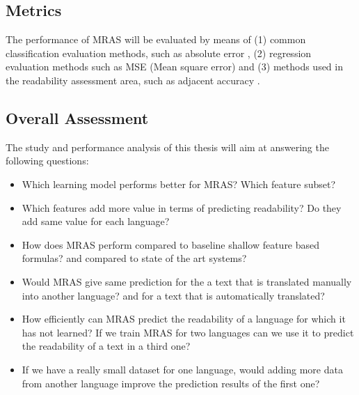 \documentclass[12pt]{article}
\begin{document}

\subsection{Metrics}
The performance of MRAS will be evaluated by means of (1) common classification evaluation methods, such as absolute error \cite{croft2010search}, (2) regression evaluation methods such as MSE (Mean square error) \cite{croft2010search} and (3) methods used in the readability assessment area, such as adjacent accuracy \cite{franccois2012ai}. 

\subsection{Overall Assessment}
The study and performance analysis of this thesis will aim at answering the following questions:
\begin{itemize}

\item Which learning model performs better for MRAS? Which feature subset?
\item Which features add more value in terms of predicting readability? Do they add same value for each language?
\item How does MRAS perform compared to baseline shallow feature based formulas? and compared to state of the art systems?
\item Would MRAS give same prediction for the a text that is translated manually into another language? and for a text that is automatically translated?
\item How efficiently can MRAS predict the readability of a language for which it has not learned? If we train MRAS for two languages can we use it to predict the readability of a text in a third one?
\item If we have a really small dataset for one language, would adding more data from another language improve the prediction results of the first one?

\end{itemize}
\end{document}
